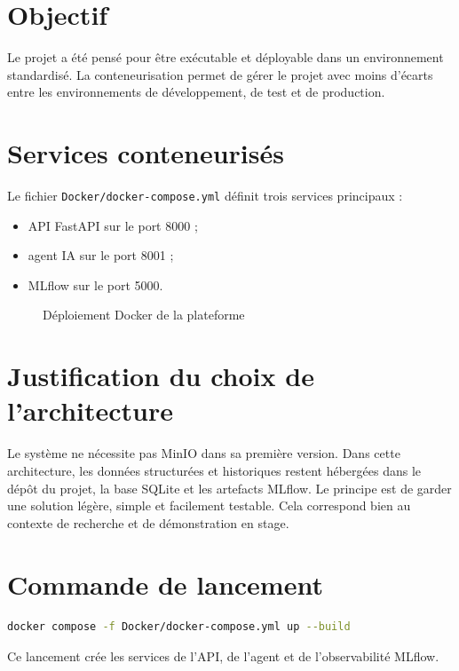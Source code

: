 \documentclass[11pt,a4paper]{report}
\begin{document}
\section{Objectif}
Le projet a été pensé pour être exécutable et déployable dans un environnement standardisé. La conteneurisation permet de gérer le projet avec moins d’écarts entre les environnements de développement, de test et de production.

\section{Services conteneurisés}
Le fichier \texttt{Docker/docker-compose.yml} définit trois services principaux :
\begin{itemize}[leftmargin=1.3em]
    \item API FastAPI sur le port 8000 ;
    \item agent IA sur le port 8001 ;
    \item MLflow sur le port 5000.
\end{itemize}

\begin{figure}[H]
\centering
{}
\caption{Déploiement Docker de la plateforme}
\end{figure}

\section{Justification du choix de l’architecture}
Le système ne nécessite pas MinIO dans sa première version. Dans cette architecture, les données structurées et historiques restent hébergées dans le dépôt du projet, la base SQLite et les artefacts MLflow. Le principe est de garder une solution légère, simple et facilement testable. Cela correspond bien au contexte de recherche et de démonstration en stage.

\section{Commande de lancement}
\begin{lstlisting}[language=bash]
docker compose -f Docker/docker-compose.yml up --build
\end{lstlisting}
Ce lancement crée les services de l’API, de l’agent et de l’observabilité MLflow.
\end{document}
